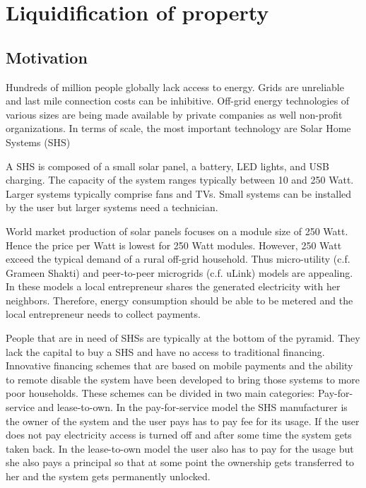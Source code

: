 \chapter{Liquidification of property}



\section{Motivation}

Hundreds of million people globally lack access to energy. Grids are unreliable and last mile connection costs can be inhibitive. Off-grid energy technologies of various sizes are being made available by private companies as well non-profit organizations. In terms of scale, the most important technology are Solar Home Systems (SHS)

A SHS is composed of a small solar panel, a battery, LED lights, and USB charging. The capacity of the system ranges typically between 10 and 250 Watt. Larger systems typically comprise fans and TVs. Small systems can be installed by the user but larger systems need a technician.

World market production of solar panels focuses on a module size of 250 Watt. Hence the price per Watt is lowest for 250 Watt modules. However, 250 Watt exceed the typical demand of a rural off-grid household. Thus micro-utility (c.f. Grameen Shakti) and peer-to-peer microgrids (c.f. uLink) models are appealing. In these models a local entrepreneur shares the generated electricity with her neighbors. Therefore, energy consumption should be able to be metered and the local entrepreneur needs to collect payments.

People that are in need of SHSs are typically at the bottom of the pyramid. They lack the capital to buy a SHS and have no access to traditional financing. Innovative financing schemes that are based on mobile payments and the ability to remote disable the system have been developed to bring those systems to more poor households. These schemes can be divided in two main categories: Pay-for-service and lease-to-own. In the pay-for-service model the SHS manufacturer is the owner of the system and the user pays has to pay fee for its usage. If the user does not pay electricity access is turned off and after some time the system gets taken back. In the lease-to-own model the user also has to pay for the usage but she also pays a principal so that at some point the ownership gets transferred to her and the system gets permanently unlocked. 

